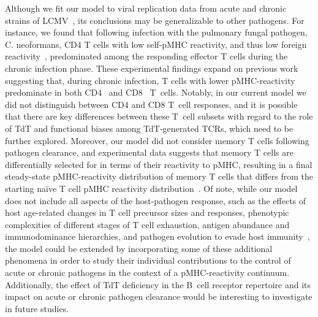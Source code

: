 Although we fit our model to viral replication data from acute and chronic strains of LCMV~\cite{wherry2003viral}, its conclusions may be generalizable to other pathogens. For instance, we found that following infection with the pulmonary fungal pathogen, C. neoformans, CD4\pos{} T cells with low self-pMHC reactivity, and thus low foreign reactivity~\cite{mandl2013t}, predominated among the responding effector T cells during the chronic infection phase. These experimental findings expand on previous work suggesting that, during chronic infection, T cells with lower pMHC-reactivity predominate in both CD4\pos{}~\cite{gallegos2016control} and CD8\pos{}~\cite{schober2020reverse,tsitsiklis2020unusual} T~cells. Notably, in our current model we did not distinguish between CD4\pos{} and CD8\pos{} T~cell responses, and it is possible that there are key differences between these T~cell subsets with regard to the role of TdT and functional biases among TdT-generated TCRs, which need to be further explored. Moreover, our model did not consider memory T cells following pathogen clearance, and experimental data suggests that memory T cells are differentially selected for in terms of their reactivity to pMHC, resulting in a final steady-state pMHC-reactivity distribution of memory T cells that differs from the starting na\"{i}ve T cell pMHC reactivity distribution~\cite{andargachew2018cd4,busch1999t,mandl2013t}. Of note, while our model does not include all aspects of the host-pathogen response, such as the effects of host age-related changes in T cell precursor sizes and responses, phenotypic complexities of different stages of T cell exhaustion, antigen abundance and immunodominance hierarchies, and pathogen evolution to evade host immunity~\cite{rouse2010immunity,mclane2019cd8,yewdell2006confronting}, the model could be extended by incorporating some of these additional phenomena in order to study their individual contributions to the control of acute or chronic pathogens in the context of a pMHC-reactivity continuum. Additionally, the effect of TdT deficiency in the B~cell receptor repertoire and its impact on acute or chronic pathogen clearance would be interesting to investigate in future studies.

